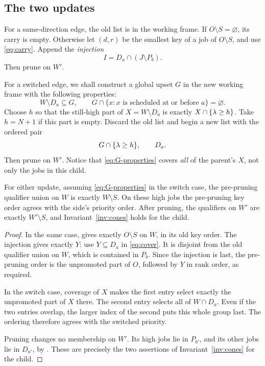 \subsection{The two updates}

For a same-direction edge, the old list is in the working frame.
If \(O\setminus S=\varnothing\), its carry is empty.
Otherwise let \((d,r)\) be the smallest key of a job of
\(O\setminus S\), and use \eqref{eq:carry}.
Append the \emph{injection}
\begin{equation}
 I=D_a\cap(J\setminus P_b).
 \label{eq:injection}
\end{equation}
Then prune on \(W'\).

For a switched edge, we shall construct a global upset \(G\) in the
new working frame with the following properties:
\begin{equation}
 W\setminus D_a\subseteq G,
 \qquad
 G\cap\{x:\text{\(x\) is scheduled at or before \(a\)}\}
 =\varnothing .
 \label{eq:G-properties}
\end{equation}
Choose \(h\) so that the still-high part of
\(X=W\setminus D_a\) is exactly \(X\cap\{\lambda\ge h\}\).
Take \(h=N+1\) if this part is empty.
Discard the old list and begin a new list with the ordered pair
\begin{equation}
 G\cap\{\lambda\ge h\},\qquad D_a.
 \label{eq:switch-pair}
\end{equation}
Then prune on \(W'\). Notice that \eqref{eq:G-properties} covers
\emph{all} of the parent's \(X\), not only the jobs in this child.

\begin{lemma}\label{lem:update-labels}
For either update, assuming \eqref{eq:G-properties} in the switch
case, the pre-pruning qualifier union on \(W\) is exactly
\(W\setminus S\). On these high jobs the pre-pruning key order
agrees with the side's priority order. After pruning, the qualifiers
on \(W'\) are exactly \(W'\setminus S\), and
Invariant~\ref{inv:cones} holds for the child.
\end{lemma}
\begin{proof}
In the same case,  gives exactly \(O\setminus S\)
on \(W\), in its old key order. The injection gives exactly \(Y\):
use \(Y\subseteq D_a\) in \eqref{eq:cover}. It is disjoint from
the old qualifier union on \(W\), which is contained in \(P_b\).
Since the injection is last, the pre-pruning order is the unpromoted
part of \(O\), followed by \(Y\) in rank order, as required.

In the switch case, coverage of \(X\) makes the first entry select
exactly the unpromoted part of \(X\) there. The second entry selects
all of \(W\cap D_a\). Even if the two entries overlap, the larger
index of the second puts this whole group last. The ordering
therefore agrees with the switched priority.

Pruning changes no membership on \(W'\). Its high jobs lie in
\(P_{b'}\), and its other jobs lie in \(D_{a'}\), by
. These are precisely the two assertions of
Invariant~\ref{inv:cones} for the child.
\end{proof}

